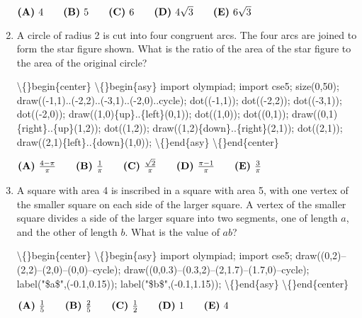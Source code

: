 \documentclass{article}
\begin{document}
\begin{enumerate}[label=\arabic*., itemsep=0.5em]
\( \textbf{(A)}\hspace{.05in}4\qquad\textbf{(B)}\hspace{.05in}5\qquad\textbf{(C)}\hspace{.05in}6\qquad\textbf{(D)}\hspace{.05in}4\sqrt3\qquad\textbf{(E)}\hspace{.05in}6\sqrt3 \)\par \vspace{0.5em}\item A circle of radius 2 is cut into four congruent arcs. The four arcs are joined to form the star figure shown. What is the ratio of the area of the star figure to the area of the original circle?



\textbackslash\{\}begin\{center\}
\textbackslash\{\}begin\{asy\}
import olympiad;
import cse5;
size(0,50);
draw((-1,1)..(-2,2)..(-3,1)..(-2,0)..cycle);
dot((-1,1));
dot((-2,2));
dot((-3,1));
dot((-2,0));
draw((1,0)\{up\}..\{left\}(0,1));
dot((1,0));
dot((0,1));
draw((0,1)\{right\}..\{up\}(1,2));
dot((1,2));
draw((1,2)\{down\}..\{right\}(2,1));
dot((2,1));
draw((2,1)\{left\}..\{down\}(1,0));
\textbackslash\{\}end\{asy\}
\textbackslash\{\}end\{center\}



\( \textbf{(A)}\hspace{.05in}\frac{4-\pi}{\pi}\qquad\textbf{(B)}\hspace{.05in}\frac{1}\pi\qquad\textbf{(C)}\hspace{.05in}\frac{\sqrt2}{\pi}\qquad\textbf{(D)}\hspace{.05in}\frac{\pi-1}{\pi}\qquad\textbf{(E)}\hspace{.05in}\frac{3}\pi \)\par \vspace{0.5em}\item A square with area 4 is inscribed in a square with area 5, with one vertex of the smaller square on each side of the larger square. A vertex of the smaller square divides a side of the larger square into two segments, one of length \( a \), and the other of length \( b \). What is the value of \( ab \)?


\textbackslash\{\}begin\{center\}
\textbackslash\{\}begin\{asy\}
import olympiad;
import cse5;
draw((0,2)--(2,2)--(2,0)--(0,0)--cycle);
draw((0,0.3)--(0.3,2)--(2,1.7)--(1.7,0)--cycle);
label("\$a\$",(-0.1,0.15));
label("\$b\$",(-0.1,1.15));
\textbackslash\{\}end\{asy\}
\textbackslash\{\}end\{center\}


\( \textbf{(A)}\hspace{.05in}\frac{1}5\qquad\textbf{(B)}\hspace{.05in}\frac{2}5\qquad\textbf{(C)}\hspace{.05in}\frac{1}2\qquad\textbf{(D)}\hspace{.05in}1\qquad\textbf{(E)}\hspace{.05in}4 \)\par \vspace{0.5em}\end{enumerate}
\end{document}
